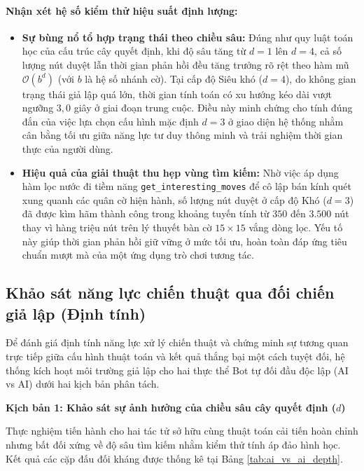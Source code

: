\paragraph{Nhận xét hệ số kiểm thử hiệu suất định lượng:}
\begin{itemize}
	\item \textbf{Sự bùng nổ tổ hợp trạng thái theo chiều sâu:} Đúng như quy luật toán học của cấu trúc cây quyết định, khi độ sâu tăng từ $d=1$ lên $d=4$, cả số lượng nút duyệt lẫn thời gian phản hồi đều tăng trưởng rõ rệt theo hàm mũ $\mathcal{O}(b^d)$ (với $b$ là hệ số nhánh cờ). Tại cấp độ Siêu khó ($d=4$), do không gian trạng thái giả lập quá lớn, thời gian tính toán có xu hướng kéo dài vượt ngưỡng $3,0$ giây ở giai đoạn trung cuộc. Điều này minh chứng cho tính đúng đắn của việc lựa chọn cấu hình mặc định $d=3$ ở giao diện hệ thống nhằm cân bằng tối ưu giữa năng lực tư duy thông minh và trải nghiệm thời gian thực của người dùng.
	\item \textbf{Hiệu quả của giải thuật thu hẹp vùng tìm kiếm:} Nhờ việc áp dụng hàm lọc nước đi tiềm năng \texttt{get\_interesting\_moves} để cô lập bán kính quét xung quanh các quân cờ hiện hành, số lượng nút duyệt ở cấp độ Khó ($d=3$) đã được kìm hãm thành công trong khoảng tuyến tính từ $350$ đến $3.500$ nút thay vì hàng triệu nút trên lý thuyết bàn cờ $15 \times 15$ vắng dòng lọc. Yếu tố này giúp thời gian phản hồi giữ vững ở mức tối ưu, hoàn toàn đáp ứng tiêu chuẩn mượt mà của một ứng dụng trò chơi tương tác.
\end{itemize}

\subsection{Khảo sát năng lực chiến thuật qua đối chiến giả lập (Định tính)}
Để đánh giá định tính năng lực xử lý chiến thuật và chứng minh sự tương quan trực tiếp giữa cấu hình thuật toán và kết quả thắng bại một cách tuyệt đối, hệ thống kích hoạt môi trường giả lập cho hai thực thể Bot tự đối đầu độc lập (AI vs AI) dưới hai kịch bản phân tách.

\textbf{Kịch bản 1: Khảo sát sự ảnh hưởng của chiều sâu cây quyết định ($d$)}

Thực nghiệm tiến hành cho hai tác tử sở hữu cùng thuật toán cải tiến hoàn chỉnh nhưng bất đối xứng về độ sâu tìm kiếm nhằm kiểm thử tính áp đảo hình học. Kết quả các cặp đấu đối kháng được thống kê tại Bảng \ref{tab:ai_vs_ai_depth}.

